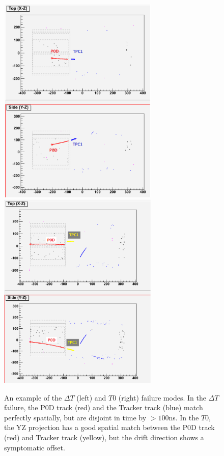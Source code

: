 \begin{figure}[h]
  \centering
  \includegraphics[width=3in]{Figures/delltaTmismatch.eps}
  \includegraphics[width=3in]{Figures/t0mismatch.eps}
  \caption{An example of the $\Delta T$ (left) and $T0$ (right) failure modes. In the  $\Delta T$ failure, the P0D track (red) and the Tracker track (blue) match perfectly spatially, but are disjoint in time by $>100$ns. In the $T0$, the YZ projection has a good spatial match between the P0D track (red) and Tracker track (yellow), but the drift direction shows a symptomatic offset.} 
  \label{fig:mismatchexamples}
\end{figure}

